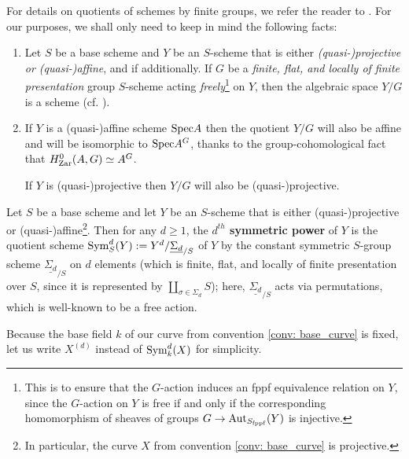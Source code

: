         \begin{remark} \label{remark: quotients_of_schemes_by_finite_group_schemes}
            For details on quotients of schemes by finite groups, we refer the reader to \cite[Expos\'e V]{SGA1}. For our purposes, we shall only need to keep in mind the following facts: 
                \begin{enumerate}
                    \item Let $S$ be a base scheme and $Y$ be an $S$-scheme that is either \textit{(quasi-)projective or (quasi-)affine}, and if additionally. If $G$ be a \textit{finite, flat, and locally of finite presentation} group $S$-scheme acting \textit{freely}\footnote{This is to ensure that the $G$-action induces an fppf equivalence relation on $Y$, since the $G$-action on $Y$ is free if and only if the corresponding homomorphism of sheaves of groups $G \to \mathrm{Aut}_{S_{\mathrm{fppf}}}(Y)$ is injective.} on $Y$, then the algebraic space $Y/G$ is a scheme (cf. \cite[\href{https://stacks.math.columbia.edu/tag/07S7}{Tag 07S7}]{stacks}). 
                    \item If $Y$ is a (quasi-)affine scheme $\mathrm{Spec} A$ then the quotient $Y/G$ will also be affine and will be isomorphic to $\mathrm{Spec} A^G$, thanks to the group-cohomological fact that $H_{\mathrm{Zar}}^0(A, G) \simeq A^G$. 
                    
                    If $Y$ is (quasi-)projective then $Y/G$ will also be (quasi-)projective.
                \end{enumerate}
        \end{remark}
        \begin{definition} \label{def: symmetric_powers_of_schemes}
            Let $S$ be a base scheme and let $Y$ be an $S$-scheme that is either (quasi-)projective or (quasi-)affine\footnote{In particular, the curve $X$ from convention \ref{conv: base_curve} is projective.}. Then for any $d \geq 1$, the \textbf{$d^{th}$ symmetric power} of $Y$ is the quotient scheme $\mathrm{Sym}^d_S(Y) := Y^d/\underline{\Sigma_d}_{/S}$ of $Y$ by the constant symmetric $S$-group scheme $\underline{\Sigma_d}_{/S}$ on $d$ elements (which is finite, flat, and locally of finite presentation over $S$, since it is represented by $\coprod_{\sigma \in \Sigma_d} S$); here, $\underline{\Sigma_d}_{/S}$ acts via permutations, which is well-known to be a free action.
        \end{definition}
        \begin{convention}
            Because the base field $k$ of our curve from convention \ref{conv: base_curve} is fixed, let us write $X^{(d)}$ instead of $\mathrm{Sym}^d_k(X)$ for simplicity.
        \end{convention}
